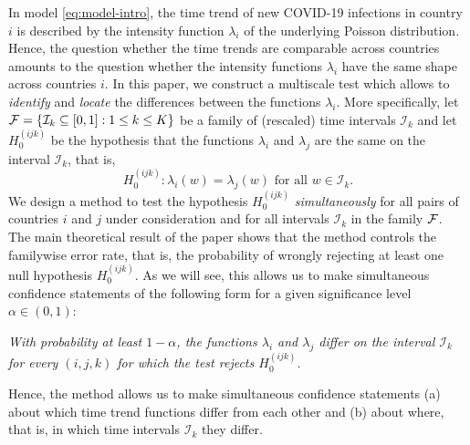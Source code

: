 \documentclass[a4paper,12pt]{article}
\numberwithin{equation}{section}
\begin{document}
In model \eqref{eq:model-intro}, the time trend of new COVID-19 infections in country $i$ is described by the intensity function $\lambda_i$ of the underlying Poisson distribution. Hence, the question whether the time trends are comparable across countries amounts to the question whether the intensity functions $\lambda_i$ have the same shape across countries $i$. In this paper, we construct a multiscale test which allows to \textit{identify} and \textit{locate} the differences between the functions $\lambda_i$. More specifically, let $\mathcal{F} = \{ \mathcal{I}_k \subseteq[0,1] : 1 \le k \le K \}$ be a family of (rescaled) time intervals $\mathcal{I}_k$ and let $H_0^{(ijk)}$ be the hypothesis that the functions $\lambda_i$ and $\lambda_j$ are the same on the interval $\mathcal{I}_k$, that is, 
\[ H_0^{(ijk)}: \lambda_i(w) = \lambda_j(w) \text{ for all } w \in \mathcal{I}_k. \]
We design a method to test the hypothesis $H_0^{(ijk)}$ \textit{simultaneously} for all pairs of countries $i$ and $j$ under consideration and for all intervals $\mathcal{I}_k$ in the family $\mathcal{F}$. The main theoretical result of the paper shows that the method controls the familywise error rate, that is, the probability of wrongly rejecting at least one null hypothesis $H_0^{(ijk)}$. As we will see, this allows us to make simultaneous confidence statements of the following form for a given significance level $\alpha \in (0,1)$: 
\begin{center}
\begin{minipage}[c][1.25cm][c]{13cm}
\textit{With probability at least $1-\alpha$, the functions $\lambda_i$ and $\lambda_j$ differ on the interval $\mathcal{I}_k$ for every $(i,j,k)$ for which the test rejects $H_0^{(ijk)}$.} 
\end{minipage}
\end{center}
Hence, the method allows us to make simultaneous confidence statements (a) about which time trend functions differ from each other and (b) about where, that is, in which time intervals $\mathcal{I}_{k}$ they differ. 
\end{document}
